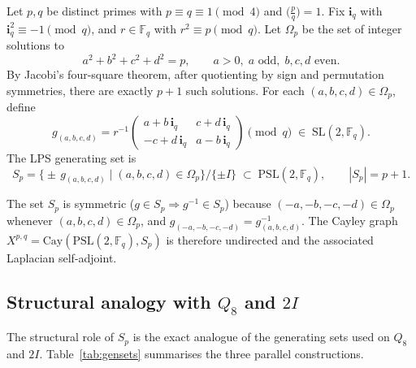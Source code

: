     \begin{definition}
      \label{def:lps}
      Let $p, q$ be distinct primes with $p \equiv q \equiv 1 \pmod{4}$ and
      $\bigl(\frac{p}{q}\bigr) = 1$.
      Fix $\mathbf{i}_q$ with $\mathbf{i}_q^2 \equiv -1 \pmod{q}$, and
      $r \in \mathbb{F}_q$ with $r^2 \equiv p \pmod{q}$.
      Let $\Omega_p$ be the set of integer solutions to
      \begin{equation}
        a^2 + b^2 + c^2 + d^2 = p,
        \qquad a > 0,\; a \text{ odd},\; b, c, d \text{ even}.
        \label{eq:sum-of-4-squares}
      \end{equation}
      By Jacobi's four-square theorem, after quotienting by sign and permutation
      symmetries, there are exactly $p+1$ such solutions.
      For each $(a,b,c,d) \in \Omega_p$, define
      \begin{equation}
        g_{(a,b,c,d)}
        = r^{-1}
        \begin{pmatrix}
          a + b\,\mathbf{i}_q & c + d\,\mathbf{i}_q \\
          -c + d\,\mathbf{i}_q & a - b\,\mathbf{i}_q
        \end{pmatrix}
        \pmod{q}
        \;\in\; \mathrm{SL}(2,\mathbb{F}_q).
        \label{eq:lps-generator}
      \end{equation}
      The LPS generating set is
      \begin{equation}
        S_p = \bigl\{ \pm\, g_{(a,b,c,d)} \mid (a,b,c,d) \in \Omega_p \bigr\}
        \big/\{\pm I\}
        \;\subset\; \mathrm{PSL}(2,\mathbb{F}_q),
        \qquad |S_p| = p+1.
        \label{eq:S-SL2}
      \end{equation}
    \end{definition}

    The set $S_p$ is symmetric ($g \in S_p \Rightarrow g^{-1} \in S_p$)
    because $(-a,-b,-c,-d) \in \Omega_p$ whenever $(a,b,c,d) \in \Omega_p$,
    and $g_{(-a,-b,-c,-d)} = g_{(a,b,c,d)}^{-1}$.
    The Cayley graph $X^{p,q} = \mathrm{Cay}(\mathrm{PSL}(2,\mathbb{F}_q), S_p)$
    is therefore undirected and the associated Laplacian self-adjoint.

  \subsection{Structural analogy with $Q_8$ and $2I$}
    \label{sec:step6a-analogy}

    The structural role of $S_p$ is the exact analogue of the generating sets
    used on $Q_8$ and $2I$.
    Table~\ref{tab:gensets} summarises the three parallel constructions.

